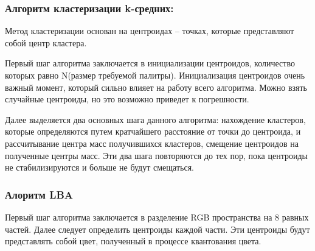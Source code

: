 \subsubsection{ Алгоритм кластеризации k-средних:}
Метод кластеризации основан на центроидах -- точках, которые представляют собой центр кластера.

Первый шаг алгоритма заключается в инициализации центроидов, количество которых равно N(размер требуемой палитры). Инициализация центроидов очень важный момент, который сильно влияет на работу всего алгоритма. Можно взять случайные центроиды, но это возможно приведет к погрешности.

Далее выделяется два основных шага данного алгоритма: нахождение кластеров, которые определяются путем кратчайшего расстояние от точки до центроида, и рассчитывание центра масс получившихся кластеров, смещение центроидов на полученные центры масс. Эти два шага повторяются до тех пор, пока центроиды не стабилизируются и больше не будут смещаться.

\begin{figure}[ht!]
\end{figure}

\subsubsection{ Алоритм LBA}
Первый шаг алгоритма заключается в разделение RGB пространства на 8 равных частей. Далее следует определить центроиды каждой части. Эти центроиды будут представлять собой цвет, полученный в процессе квантования цвета.

\begin{figure}[ht!]
\end{figure}

